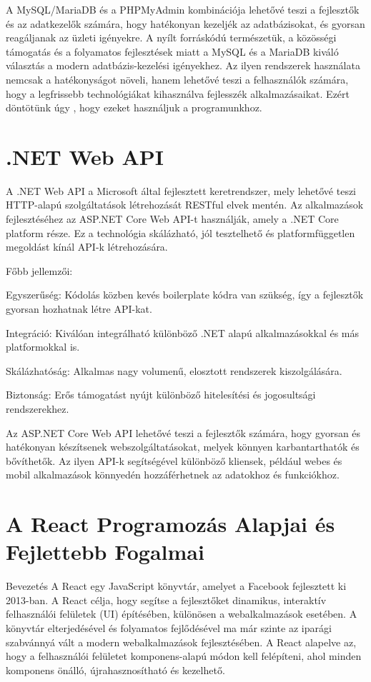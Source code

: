 \documentclass[colorlinks]{thesis-kando}
\theoremstyle{definition}
\theoremstyle{remark}
\begin{document}
A MySQL/MariaDB és a PHPMyAdmin kombinációja lehetővé teszi a fejlesztők és az adatkezelők számára, hogy hatékonyan kezeljék az adatbázisokat, és gyorsan reagáljanak az üzleti igényekre. A nyílt forráskódú természetük, a közösségi támogatás és a folyamatos fejlesztések miatt a MySQL és a MariaDB kiváló választás a modern adatbázis-kezelési igényekhez. Az ilyen rendszerek használata nemcsak a hatékonyságot növeli, hanem lehetővé teszi a felhasználók számára, hogy a legfrissebb technológiákat kihasználva fejlesszék alkalmazásaikat. Ezért döntötünk úgy , hogy ezeket használjuk a programunkhoz.

\section{.NET Web API}

A .NET Web API a Microsoft által fejlesztett keretrendszer, mely lehetővé teszi HTTP-alapú szolgáltatások létrehozását RESTful elvek mentén. Az alkalmazások fejlesztéséhez az ASP.NET Core Web API-t használják, amely a .NET Core platform része. Ez a technológia skálázható, jól tesztelhető és platformfüggetlen megoldást kínál API-k létrehozására.

Főbb jellemzői:

Egyszerűség: Kódolás közben kevés boilerplate kódra van szükség, így a fejlesztők gyorsan hozhatnak létre API-kat.

Integráció: Kiválóan integrálható különböző .NET alapú alkalmazásokkal és más platformokkal is.

Skálázhatóság: Alkalmas nagy volumenű, elosztott rendszerek kiszolgálására.

Biztonság: Erős támogatást nyújt különböző hitelesítési és jogosultsági rendszerekhez.

Az ASP.NET Core Web API lehetővé teszi a fejlesztők számára, hogy gyorsan és hatékonyan készítsenek webszolgáltatásokat, melyek könnyen karbantarthatók és bővíthetők. Az ilyen API-k segítségével különböző kliensek, például webes és mobil alkalmazások könnyedén hozzáférhetnek az adatokhoz és funkciókhoz.

\section{A React Programozás Alapjai és Fejlettebb Fogalmai}

Bevezetés
A React egy JavaScript könyvtár, amelyet a Facebook fejlesztett ki 2013-ban. A React célja, hogy segítse a fejlesztőket dinamikus, interaktív felhasználói felületek (UI) építésében, különösen a webalkalmazások esetében. A könyvtár elterjedésével és folyamatos fejlődésével ma már szinte az iparági szabvánnyá vált a modern webalkalmazások fejlesztésében. A React alapelve az, hogy a felhasználói felületet komponens-alapú módon kell felépíteni, ahol minden komponens önálló, újrahasznosítható és kezelhető.
\end{document}
